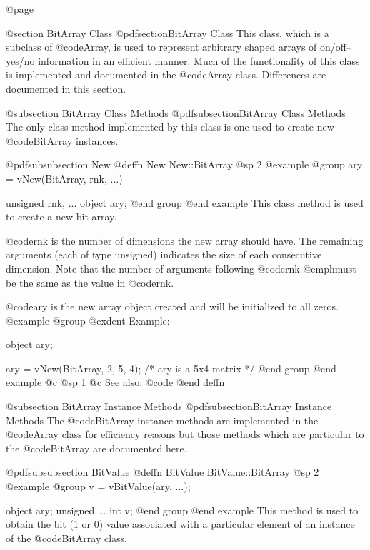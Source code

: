 @page

@section  BitArray Class
@pdfsection{BitArray Class}
This class, which is a subclass of @code{Array}, is used to represent
arbitrary shaped arrays of on/off--yes/no information in an efficient
manner.  Much of the functionality of this class is implemented and
documented in the @code{Array} class.  Differences are documented in
this section.



@subsection BitArray Class Methods
@pdfsubsection{BitArray Class Methods}
The only class method implemented by this class is one used to create
new @code{BitArray} instances.






@pdfsubsubsection {New}
@deffn {New} New::BitArray
@sp 2
@example
@group
ary = vNew(BitArray, rnk, ...)

unsigned  rnk, ...
object    ary;
@end group
@end example
This class method is used to create a new bit array.

@code{rnk} is the number of dimensions the new array should have.
The remaining arguments (each of type unsigned) indicates the size of
each consecutive dimension.  Note that the number of arguments following
@code{rnk} @emph{must} be the same as the value in @code{rnk}.

@code{ary} is the new array object created and will be initialized to
all zeros.
@example
@group
@exdent Example:

object  ary;

ary = vNew(BitArray, 2, 5, 4);
/*  ary is a 5x4 matrix  */
@end group
@end example
@c @sp 1
@c See also:  @code{}
@end deffn



@subsection BitArray Instance Methods
@pdfsubsection{BitArray Instance Methods}
The @code{BitArray} instance methods are implemented in the @code{Array} class
for efficiency reasons but those methods which are particular to the
@code{BitArray} are documented here.








@pdfsubsubsection {BitValue}
@deffn {BitValue} BitValue::BitArray
@sp 2
@example
@group
v = vBitValue(ary, ...);

object    ary;
unsigned  ...
int       v;
@end group
@end example
This method is used to obtain the bit (1 or 0) value associated with a
particular element of an instance of the @code{BitArray} class.

